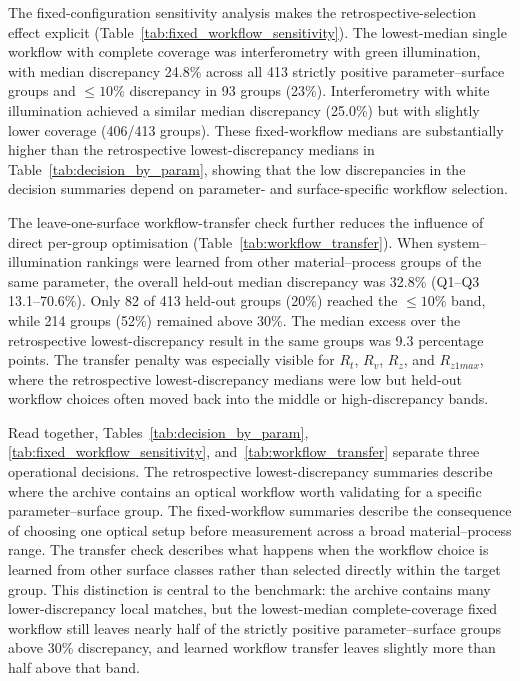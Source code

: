 \documentclass{article}
\begin{document}
The fixed-configuration sensitivity analysis makes the retrospective-selection effect explicit (Table~\ref{tab:fixed_workflow_sensitivity}). The lowest-median single workflow with complete coverage was interferometry with green illumination, with median discrepancy 24.8\% across all 413 strictly positive parameter--surface groups and $\leq 10\%$ discrepancy in 93 groups (23\%). Interferometry with white illumination achieved a similar median discrepancy (25.0\%) but with slightly lower coverage (406/413 groups). These fixed-workflow medians are substantially higher than the retrospective lowest-discrepancy medians in Table~\ref{tab:decision_by_param}, showing that the low discrepancies in the decision summaries depend on parameter- and surface-specific workflow selection.



The leave-one-surface workflow-transfer check further reduces the influence of direct per-group optimisation (Table~\ref{tab:workflow_transfer}). When system--illumination rankings were learned from other material--process groups of the same parameter, the overall held-out median discrepancy was 32.8\% (Q1--Q3 13.1--70.6\%). Only 82 of 413 held-out groups (20\%) reached the $\leq 10\%$ band, while 214 groups (52\%) remained above 30\%. The median excess over the retrospective lowest-discrepancy result in the same groups was 9.3 percentage points. The transfer penalty was especially visible for $R_t$, $R_v$, $R_z$, and $R_{z1max}$, where the retrospective lowest-discrepancy medians were low but held-out workflow choices often moved back into the middle or high-discrepancy bands.



Read together, Tables~\ref{tab:decision_by_param}, \ref{tab:fixed_workflow_sensitivity}, and~\ref{tab:workflow_transfer} separate three operational decisions. The retrospective lowest-discrepancy summaries describe where the archive contains an optical workflow worth validating for a specific parameter--surface group. The fixed-workflow summaries describe the consequence of choosing one optical setup before measurement across a broad material--process range. The transfer check describes what happens when the workflow choice is learned from other surface classes rather than selected directly within the target group. This distinction is central to the benchmark: the archive contains many lower-discrepancy local matches, but the lowest-median complete-coverage fixed workflow still leaves nearly half of the strictly positive parameter--surface groups above 30\% discrepancy, and learned workflow transfer leaves slightly more than half above that band.
\end{document}
